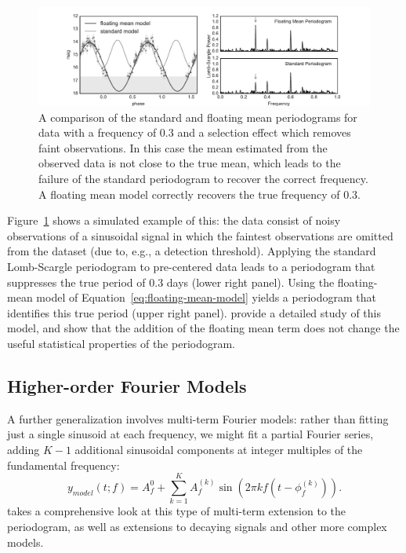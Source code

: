\documentclass[preprint]{aastex}
\newcommand{\Fig}[1]{Figure~\ref{fig:#1}}
\newcommand{\figlabel}[1]{\label{fig:#1}}
\newcommand{\Eq}[1]{Equation~\ref{eq:#1}}
\newcommand{\eq}[1]{\Eq{#1}}
\newcommand{\sectlabel}[1]{\label{sect:#1}}
\begin{document}
\begin{figure}[ht]
  \centering
  \includegraphics[width=\textwidth]{fig20_standard_vs_floatingmean}
  \caption{A comparison of the standard and floating mean periodograms for
    data with a frequency of 0.3 and a selection effect which removes
    faint observations.
    In this case the mean estimated from the observed data is not close to
    the true mean, which leads to the failure of the standard periodogram to
    recover the correct frequency. A floating mean model correctly recovers
    the true frequency of 0.3.
    \figlabel{standard-vs-floatingmean}}
\end{figure}

\Fig{standard-vs-floatingmean} shows a simulated example of this: the data
consist of noisy observations of a sinusoidal signal in which the faintest
observations are omitted from the dataset (due to, e.g., a detection threshold).
Applying the standard Lomb-Scargle periodogram to pre-centered data leads to a
periodogram that suppresses the true period of 0.3 days (lower right panel).
Using the floating-mean model of \eq{floating-mean-model} yields a periodogram
that identifies this true period (upper right panel).
\citet{Zechmeister09} provide a detailed study of this model,
and show that the addition of the floating mean term does not change
the useful statistical properties of the periodogram.

\subsection{Higher-order Fourier Models}
\sectlabel{multiterm}

A further generalization involves multi-term Fourier models:
rather than fitting just a single sinusoid at each frequency, we might fit a
partial Fourier series, adding $K-1$ additional sinusoidal components at
integer multiples of the fundamental frequency:
\begin{equation}
  y_{model}(t;f) = A_f^{0} + \sum_{k=1}^K A_f^{(k)} \sin(2\pi k f (t - \phi_f^{(k)})).
\end{equation}
\citet{Bretthorst88} takes a comprehensive look at this type of multi-term
extension to the periodogram, as well as extensions to decaying signals and
other more complex models.
\end{document}
